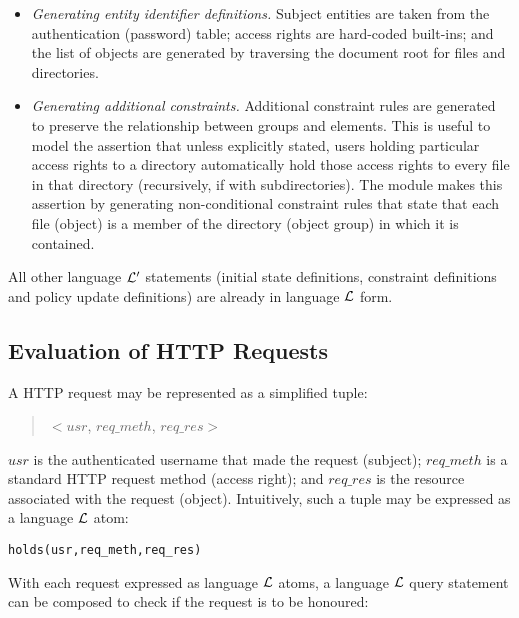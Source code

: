 \documentclass[glov2,twocolumn,final]{svjour2}
\newenvironment{vverbatim}
  {\begin{alltt}}
  {\vspace{-\baselineskip}\end{alltt}}
\begin{document}
      \begin{itemize}
        \item
          {\em Generating entity identifier definitions.} Subject entities are
          taken from the authentication (password) table; access rights are
          hard-coded built-ins; and the list of objects are generated by
          traversing the document root for files and directories.
        \item
          {\em Generating additional constraints.} Additional constraint
          rules are generated to preserve the relationship between groups
          and elements. This is useful to model the assertion that unless
          explicitly stated, users holding particular access rights to a
          directory automatically hold those access rights to every file in
          that directory (recursively, if with subdirectories). The module
          makes this assertion by generating non-conditional constraint rules
          that state that each file (object) is a member of the directory
          (object group) in which it is contained.
      \end{itemize}

      All other language ${\cal L'}$ statements (initial state definitions,
      constraint definitions and policy update definitions) are already in
      language ${\cal L}$ form.

    \subsection{Evaluation of HTTP Requests}

      A HTTP request may be represented as a simplified tuple:

      \begin{quote}
        $<$$usr$, $req\_meth$, $req\_res$$>$
      \end{quote}

      $usr$ is the authenticated username that made the request (subject);
      $req\_meth$ is a standard HTTP request method (access right); and
      $req\_res$ is the resource associated with the request (object).
      Intuitively, such a tuple may be expressed as a language ${\cal L}$ atom:

      \begin{vverbatim}
  holds(usr, req\_meth, req\_res)
      \end{vverbatim}

      With each request expressed as language ${\cal L}$ atoms, a language
      ${\cal L}$ query statement can be composed to check if the request is
      to be honoured:
\end{document}
